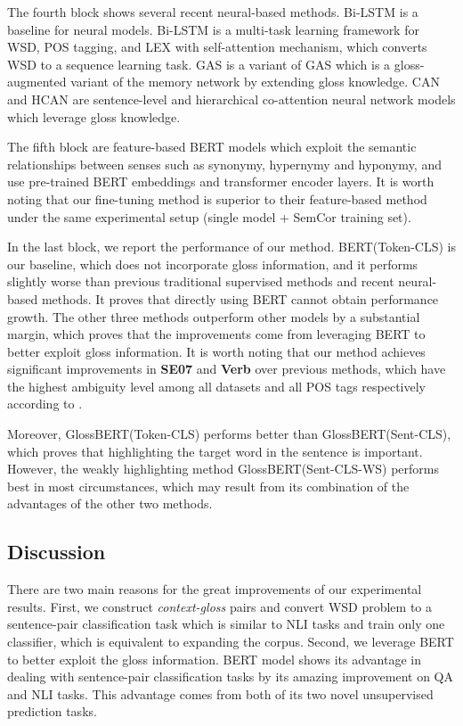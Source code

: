 \documentclass[11pt,a4paper]{article}
\begin{document}
The fourth block shows several recent neural-based methods. Bi-LSTM \citep{kaageback2016word} is a baseline for neural models. Bi-LSTM \citep{raganato2017neural} is a multi-task learning framework for WSD, POS tagging, and LEX with self-attention mechanism, which converts WSD to a sequence learning task. GAS \citep{luo2018incorporating} is a variant of GAS which is a gloss-augmented variant of the memory network by extending gloss knowledge. CAN and HCAN \citep{luo2018leveraging} are sentence-level and hierarchical co-attention neural network models which leverage gloss knowledge.

The fifth block are feature-based BERT models \cite{vial2019sense} which exploit the semantic relationships between senses such as synonymy, hypernymy and hyponymy, and use pre-trained BERT embeddings and transformer encoder layers. It is worth noting that our fine-tuning method is superior to their feature-based method under the same experimental setup (single model + SemCor training set). 

In the last block, we report the performance of our method. BERT(Token-CLS) is our baseline, which does not incorporate gloss information, and it performs slightly worse than previous traditional supervised methods and recent neural-based methods. It proves that directly using BERT cannot obtain performance growth. The other three methods outperform other models by a substantial margin, which proves that the improvements come from leveraging BERT to better exploit gloss information. It is worth noting that our method achieves significant improvements in \textbf{SE07} and \textbf{Verb} over previous methods, which have the highest ambiguity level among all datasets and all POS tags respectively according to \citet{raganato2017word}.

Moreover, GlossBERT(Token-CLS) performs better than GlossBERT(Sent-CLS), which proves that highlighting the target word in the sentence is important. However, the weakly highlighting method GlossBERT(Sent-CLS-WS) performs best in most circumstances, which may result from its combination of the advantages of the other two methods.





\subsection{Discussion}
There are two main reasons for the great improvements of our experimental results. First, we construct \textit{context-gloss} pairs and convert WSD problem to a sentence-pair classification task which is similar to NLI tasks and train only one classifier, which is equivalent to expanding the corpus. Second, we leverage BERT \citep{devlin2018bert} to better exploit the gloss information. BERT model shows its advantage in dealing with sentence-pair classification tasks by its amazing improvement on QA and NLI tasks. This advantage comes from both of its two novel unsupervised prediction tasks.
\end{document}
